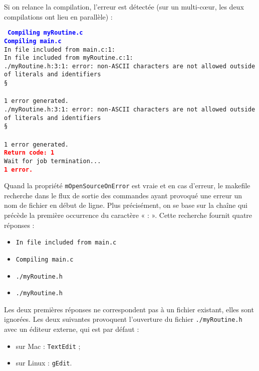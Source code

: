 \documentclass[a4paper,11pt]{extarticle}
\begin{document}
Si on relance la compilation, l'erreur est détectée (sur un multi-cœur, les deux compilations ont lieu en parallèle) :

\begin{mdframed}[hidealllines=true,backgroundcolor=lightgray!20]
\noindent\texttt{\footnotesize
\textcolor{blue}{\bf Compiling myRoutine.c}\\
\textcolor{blue}{\bf Compiling main.c}\\
In file included from main.c:1:\\
In file included from myRoutine.c:1:\\
./myRoutine.h:3:1: error: non-ASCII characters are not allowed outside of literals and identifiers\\
\S\\
\^\\
1 error generated.\\
./myRoutine.h:3:1: error: non-ASCII characters are not allowed outside of literals and identifiers\\
\S\\
\^\\
1 error generated.\\
\textcolor{red}{\bf Return code: 1}\\
Wait for job termination...\\
\textcolor{red}{\bf 1 error.}
}
\end{mdframed}

Quand la propriété \texttt{mOpenSourceOnError} est vraie et en cas d'erreur, le makefile recherche dans le flux de sortie des commandes ayant provoqué une erreur un nom de fichier en début de ligne. Plus précisément, on se base sur la chaîne qui précède la première occurrence du caractère « : ». Cette recherche fournit quatre réponses :
\begin{itemize}
\item \colorbox{lightgray!20}{\tt In file included from main.c}
\item \colorbox{lightgray!20}{\tt Compiling main.c}
\item \colorbox{lightgray!20}{\tt ./myRoutine.h}
\item \colorbox{lightgray!20}{\tt ./myRoutine.h}
\end{itemize}

Les deux premières réponses ne correspondent pas à un fichier existant, elles sont ignorées. Les deux suivantes provoquent l'ouverture du fichier \texttt{./myRoutine.h} avec un éditeur externe, qui est par défaut :
\begin{itemize}
\item sur Mac : \texttt{TextEdit} ;
\item sur Linux : \texttt{gEdit}.
\end{itemize}
\end{document}
